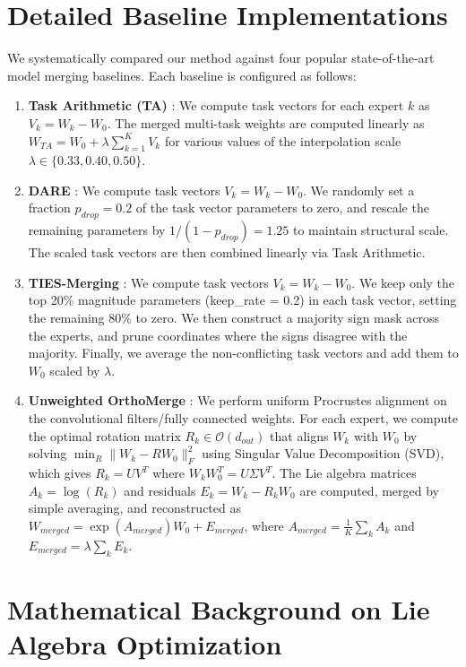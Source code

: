 \documentclass{article}
\theoremstyle{plain}
\theoremstyle{definition}
\theoremstyle{remark}
\begin{document}
\section{Detailed Baseline Implementations}
\label{app:baselines}

We systematically compared our method against four popular state-of-the-art model merging baselines. Each baseline is configured as follows:
\begin{enumerate}
    \item \textbf{Task Arithmetic (TA)} \cite{ilharco22}: We compute task vectors for each expert $k$ as $V_k = W_k - W_0$. The merged multi-task weights are computed linearly as $W_{TA} = W_0 + \lambda \sum_{k=1}^K V_k$ for various values of the interpolation scale $\lambda \in \{0.33, 0.40, 0.50\}$.
    \item \textbf{DARE} \cite{yu23}: We compute task vectors $V_k = W_k - W_0$. We randomly set a fraction $p_{drop} = 0.2$ of the task vector parameters to zero, and rescale the remaining parameters by $1 / (1 - p_{drop}) = 1.25$ to maintain structural scale. The scaled task vectors are then combined linearly via Task Arithmetic.
    \item \textbf{TIES-Merging} \cite{yadav23}: We compute task vectors $V_k = W_k - W_0$. We keep only the top 20\% magnitude parameters (keep\_rate = 0.2) in each task vector, setting the remaining 80\% to zero. We then construct a majority sign mask across the experts, and prune coordinates where the signs disagree with the majority. Finally, we average the non-conflicting task vectors and add them to $W_0$ scaled by $\lambda$.
    \item \textbf{Unweighted OrthoMerge} \cite{orthomerge}: We perform uniform Procrustes alignment on the convolutional filters/fully connected weights. For each expert, we compute the optimal rotation matrix $R_k \in \mathcal{O}(d_{out})$ that aligns $W_k$ with $W_0$ by solving $\min_R \|W_k - R W_0\|_F^2$ using Singular Value Decomposition (SVD), which gives $R_k = U V^T$ where $W_k W_0^T = U \Sigma V^T$. The Lie algebra matrices $A_k = \log(R_k)$ and residuals $E_k = W_k - R_k W_0$ are computed, merged by simple averaging, and reconstructed as $W_{merged} = \exp(A_{merged}) W_0 + E_{merged}$, where $A_{merged} = \frac{1}{K} \sum_k A_k$ and $E_{merged} = \lambda \sum_k E_k$.
\end{enumerate}

\section{Mathematical Background on Lie Algebra Optimization}
\label{app:lie_algebra}
\end{document}
